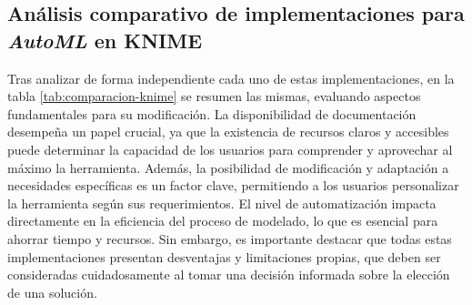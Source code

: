 \subsection{Análisis comparativo de implementaciones para \textit{AutoML} en KNIME}
Tras analizar de forma independiente cada uno de estas implementaciones, en la tabla \ref{tab:comparacion-knime} se resumen las mismas, evaluando aspectos fundamentales para su modificación.  La disponibilidad de documentación desempeña un papel crucial, ya que la existencia de recursos claros y accesibles puede determinar la capacidad de los usuarios para comprender y aprovechar al máximo la herramienta. Además, la posibilidad de modificación y adaptación a necesidades específicas es un factor clave, permitiendo a los usuarios personalizar la herramienta según sus requerimientos. El nivel de automatización impacta directamente en la eficiencia del proceso de modelado, lo que es esencial para ahorrar tiempo y recursos. Sin embargo, es importante destacar que todas estas implementaciones presentan desventajas y limitaciones propias, que deben ser consideradas cuidadosamente al tomar una decisión informada sobre la elección de una solución.

